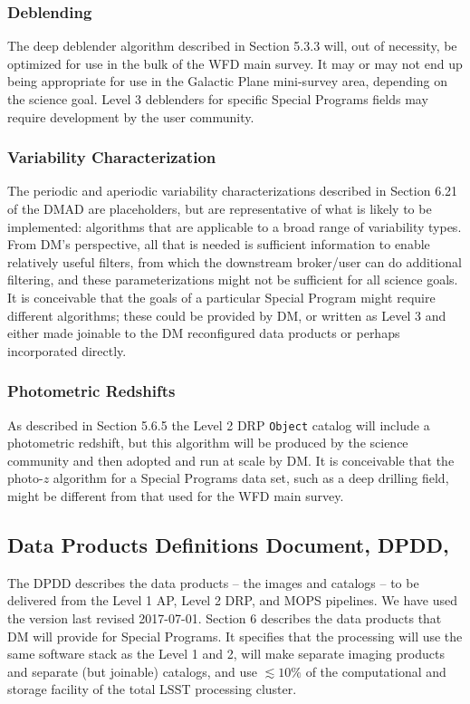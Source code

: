 \documentclass[DM,lsstdraft,toc]{lsstdoc}
\begin{document}
\subsubsection{Deblending} The deep deblender algorithm described in Section 5.3.3 will, out of necessity, be optimized for use in the bulk of the WFD main survey. It may or may not end up being appropriate for use in the Galactic Plane mini-survey area, depending on the science goal. Level 3 deblenders for specific Special Programs fields may require development by the user community.

\subsubsection{Variability Characterization} The periodic and aperiodic variability characterizations described in Section 6.21 of the DMAD are placeholders, but are representative of what is likely to be implemented: algorithms that are applicable to a broad range of variability types. From DM's perspective, all that is needed is sufficient information to enable relatively useful filters, from which the downstream broker/user can do additional filtering, and these parameterizations might not be sufficient for all science goals. It is conceivable that the goals of a particular Special Program might require different algorithms; these could be provided by DM, or written as Level 3 and either made joinable to the DM reconfigured data products or perhaps incorporated directly.

\subsubsection{Photometric Redshifts} As described in Section 5.6.5 the Level 2 DRP \texttt{Object} catalog will include a photometric redshift, but this algorithm will be produced by the science community and then adopted and run at scale by DM. It is conceivable that the photo-$z$ algorithm for a Special Programs data set, such as a deep drilling field, might be different from that used for the WFD main survey.

\subsection{Data Products Definitions Document, DPDD, }\label{ssec:docrev_dpdd}

The DPDD describes the data products -- the images and catalogs -- to be delivered from the Level 1 AP, Level 2 DRP, and MOPS pipelines. We have used the version last revised 2017-07-01. Section 6 describes the data products that DM will provide for Special Programs. It specifies that the processing will use the same software stack as the Level 1 and 2, will make separate imaging products and separate (but joinable) catalogs, and use $\lesssim10\%$ of the computational and storage facility of the total LSST processing cluster.
\end{document}
